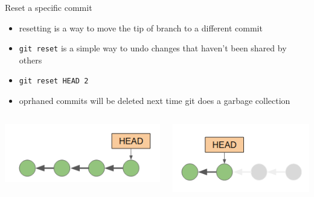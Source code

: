 \documentclass[12pt]{beamer}
\begin{document}
\begin{frame}{Reset a specific commit}
\begin{itemize}
	\item resetting is a way to move the tip of branch to a different commit
	\item \texttt{git reset} is a simple way to undo changes that haven't been shared by others
	\item \texttt{git reset HEAD~2}
	\item oprhaned commits will be deleted next time git does a garbage collection
\end{itemize}
\begin{columns}
	\begin{column}{0.5\linewidth}
		\includegraphics[width=0.8\linewidth]{before_reset}
	\end{column}
	\begin{column}{0.5\linewidth}
		\includegraphics[width=0.8\linewidth]{after_reset}
	\end{column}
\end{columns}
\end{frame}
\end{document}
